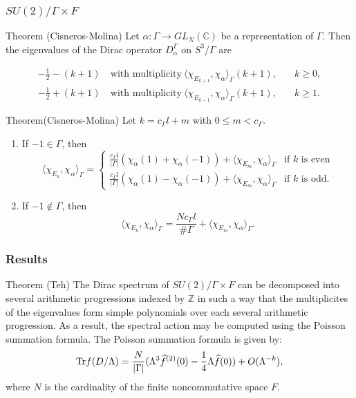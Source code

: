 \documentclass{beamer}
\def\C{{\mathbb C}}
\def\Z{{\mathbb Z}}
\def\Tr{{\rm Tr}}
\begin{document}
\begin{frame}
  \frametitle{$SU(2)/\Gamma \times F$}
  \begin{block}{Theorem (Cisneros-Molina)}
Let $\alpha :\Gamma \rightarrow GL_N(\C)$ be a representation of $\Gamma$.  Then the eigenvalues of the Dirac operator $D_{\alpha}^{\Gamma}$ on $S^3 / \Gamma$ are

\begin{align*}
-\frac{1}{2}-(k+1)~ &\mbox{with~multiplicity}~ \langle \chi_{E_{k+1}}, \chi_{\alpha} \rangle_{\Gamma} (k + 1), \quad &k \geq 0, \\
-\frac{1}{2}+(k+1)~ &\mbox{with~multiplicity}~ \langle \chi_{E_{k-1}}, \chi_{\alpha} \rangle_{\Gamma} (k + 1), \quad &k \geq 1.
\end{align*}
  \end{block}
\end{frame}

\begin{frame}
\begin{block}{Theorem(Cisneros-Molina)}
Let $k = c_{\Gamma} l + m$ with $0 \leq m < c_{\Gamma}$.
\begin{enumerate}
\item If $ -1 \in \Gamma$, then
\[
\langle \chi_{E_k}, \chi_{\alpha} \rangle_{\Gamma} =
\left\{
	\begin{array}{ll}
		\frac{c_{\Gamma} l}{|\Gamma |} (\chi_{\alpha}(1) + \chi_{\alpha}(-1)) + \langle \chi_{E_m}, \chi_{\alpha} \rangle_{\Gamma}  & \mbox{if $k$ is even}  \\
		\frac{c_{\Gamma} l}{|\Gamma |} (\chi_{\alpha}(1) - \chi_{\alpha}(-1)) + \langle \chi_{E_m}, \chi_{\alpha} \rangle_{\Gamma} & \mbox{if $k$ is odd}.
	\end{array}
\right.
\]
\item If $-1 \notin \Gamma$, then
\[
\langle \chi_{E_k}, \chi_{\alpha} \rangle_{\Gamma} = \frac{N c_{\Gamma}l}{\#\Gamma} + \langle \chi_{E_m}, \chi_{\alpha} \rangle_{\Gamma}.
\]
\end{enumerate}
\end{block}

\end{frame}

\begin{frame}
  \frametitle{Results}
  \begin{block}{Theorem (Teh)}
    The Dirac spectrum of $SU(2)/\Gamma \times F$ can be decomposed into several arithmetic progressions indexed by $\Z$ in such a way that the multiplicites of the eigenvalues form simple polynomials over each several arithmetic progression. As a result, the spectral action may be computed using the Poisson summation formula. The Poisson summation formula is given by:
    \[
      \Tr f(D / \Lambda) = \frac{N}{|\Gamma|}(\Lambda ^3 \widehat{f}^{(2)}(0) - \frac{1}{4}\Lambda \widehat{f}(0)) + O(\Lambda ^{-k}),
    \]
    where $N$ is the cardinality of the finite noncommutative space $F$.
  \end{block}
\end{frame}
\end{document}
